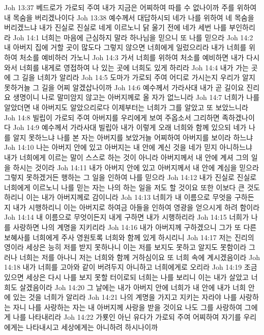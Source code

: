 Joh 13:37  베드로가 가로되 주여 내가 지금은 어찌하여 따를 수 없나이까 주를 위하여 내 목숨을 버리겠나이다
Joh 13:38  예수께서 대답하시되 네가 나를 위하여 네 목숨을 버리겠느냐 내가 진실로 진실로 네게 이르노니 닭 울기 전에 네가 세번 나를 부인하리라
Joh 14:1  너희는 마음에 근심하지 말라 하나님을 믿으니 또 나를 믿으라
Joh 14:2  내 아버지 집에 거할 곳이 많도다 그렇지 않으면 너희에게 일렀으리라 내가 너희를 위하여 처소를 예비하러 가노니
Joh 14:3  가서 너희를 위하여 처소를 예비하면 내가 다시 와서 너희를 내게로 영접하여 나 있는 곳에 너희도 있게 하리라
Joh 14:4  내가 가는 곳에 그 길을 너희가 알리라
Joh 14:5  도마가 가로되 주여 어디로 가시는지 우리가 알지 못하거늘 그 길을 어찌 알겠삽나이까
Joh 14:6  예수께서 가라사대 내가 곧 길이요 진리요 생명이니 나로 말미암지 않고는 아버지께로 올 자가 없느니라
Joh 14:7  너희가 나를 알았더면 내 아버지도 알았으리로다 이제부터는 너희가 그를 알았고 또 보았느니라
Joh 14:8  빌립이 가로되 주여 아버지를 우리에게 보여 주옵소서 그리하면 족하겠나이다
Joh 14:9  예수께서 가라사대 빌립아 내가 이렇게 오래 너희와 함께 있으되 네가 나를 알지 못하느냐 나를 본 자는 아버지를 보았거늘 어찌하여 아버지를 보이라 하느냐
Joh 14:10  나는 아버지 안에 있고 아버지는 내 안에 계신 것을 네가 믿지 아니하느냐 내가 너희에게 이르는 말이 스스로 하는 것이 아니라 아버지께서 내 안에 계셔 그의 일을 하시는 것이라
Joh 14:11  내가 아버지 안에 있고 아버지께서 내 안에 계심을 믿으라 그렇지 못하겠거든 행하는 그 일을 인하여 나를 믿으라
Joh 14:12  내가 진실로 진실로 너희에게 이르노니 나를 믿는 자는 나의 하는 일을 저도 할 것이요 또한 이보다 큰 것도 하리니 이는 내가 아버지께로 감이니라
Joh 14:13  너희가 내 이름으로 무엇을 구하든지 내가 시행하리니 이는 아버지로 하여금 아들을 인하여 영광을 얻으시게 하려 함이라
Joh 14:14  내 이름으로 무엇이든지 내게 구하면 내가 시행하리라
Joh 14:15  너희가 나를 사랑하면 나의 계명을 지키리라
Joh 14:16  내가 아버지께 구하겠으니 그가 또 다른 보혜사를 너희에게 주사 영원토록 너희와 함께 있게 하시리니
Joh 14:17  저는 진리의 영이라 세상은 능히 저를 받지 못하나니 이는 저를 보지도 못하고 알지도 못함이라 그러나 너희는 저를 아나니 저는 너희와 함께 거하심이요 또 너희 속에 계시겠음이라
Joh 14:18  내가 너희를 고아와 같이 버려두지 아니하고 너희에게로 오리라
Joh 14:19  조금 있으면 세상은 다시 나를 보지 못할 터이로되 너희는 나를 보리니 이는 내가 살았고 너희도 살겠음이라
Joh 14:20  그 날에는 내가 아버지 안에 너희가 내 안에 내가 너희 안에 있는 것을 너희가 알리라
Joh 14:21  나의 계명을 가지고 지키는 자라야 나를 사랑하는 자니 나를 사랑하는 자는 내 아버지께 사랑을 받을 것이요 나도 그를 사랑하여 그에게 나를 나타내리라
Joh 14:22  가룟인 아닌 유다가 가로되 주여 어찌하여 자기를 우리에게는 나타내시고 세상에게는 아니하려 하시나이까
